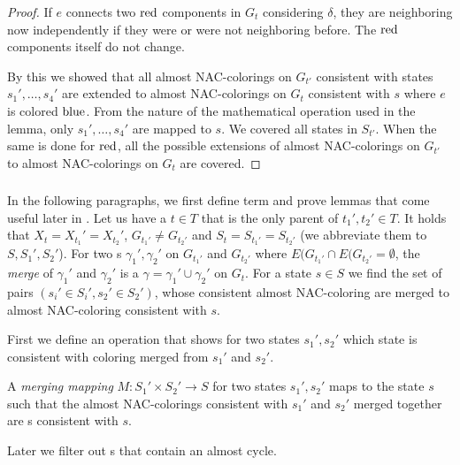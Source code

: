 \begin{proof}
	If \( e \) connects two \( \text{red} \) components in \( G_t \)
	considering \( \delta \),
	they are neighboring now independently if they were or were not neighboring before.
	The \( \text{red} \) components itself do not change.

	By this we showed that all almost NAC-colorings on \( G_{t'} \) consistent with
	states \( s_1', \dots, s_4' \) are extended to almost NAC-colorings on \( G_t \)
	consistent with \( s \) where \( e \) is colored \( \text{blue} \).
	From the nature of the mathematical operation used in the lemma,
	only \( s_1', \dots, s_4' \) are mapped to \( s \).
	We covered all states in \( S_{t'} \).
	When the same is done for \( \text{red} \), all the possible extensions
	of almost NAC-colorings on \( G_{t'} \) to almost NAC-colorings on \( G_t \)
	are covered.
\end{proof}

\subsubsection*{\JoinNode{}}

In the following paragraphs,
we first define term and prove lemmas
that come useful later in .
%
Let us have a \JoinNode{} \( t \in T \) that is
the only parent of \( t_1', t_2' \in T \).
It holds that \( X_t = X_{t_1}' = X_{t_2}' \),
\( G_{t_1'} \ne G_{t_2'} \)
and \( S_t = S_{t_1'} = S_{t_2'} \)
(we abbreviate them to \( S, S_1', S_2' \)).
%
For two \rbcol{}s \( \gamma_1', \gamma_2' \)
on \( G_{t_1'} \) and \( G_{t_2'} \)
where \( E(G_{t_1'} \cap E(G_{t_2'} = \emptyset \),
the \emph{merge} of \( \gamma_1' \) and \( \gamma_2' \)
is a \rbcol{} \( \gamma = \gamma_1' \cup \gamma_2' \) on \( G_t \).
%
For a state \( s \in S \) we find the set of
pairs \( (s_i' \in S_i', s_2' \in S_2') \),
whose consistent almost NAC-coloring are merged
to almost NAC-coloring consistent with \( s \).

First we define an operation that shows for two states \( s_1', s_2' \)
which state is consistent with coloring merged from \( s_1' \) and \( s_2' \).
%
\begin{definition}
	A \emph{merging mapping} \( M: S_1' \times S_2' \to S \)
	for two states \( s_1', s_2' \) maps to the state \( s \)
	such that the almost NAC-colorings consistent with \( s_1' \) and \( s_2' \)
	merged together are \rbcol{}s consistent with \( s \).
\end{definition}
%
Later we filter out \rbcol{}s that contain an almost cycle.

